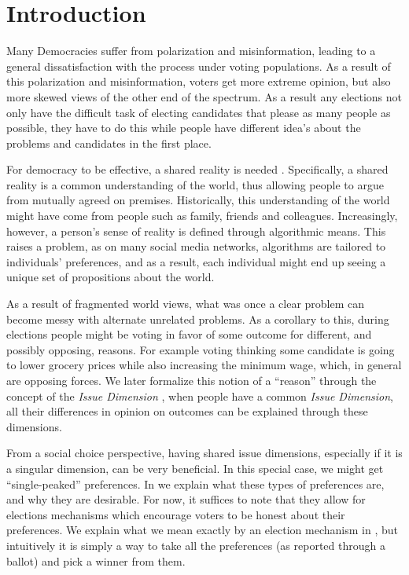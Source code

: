 \newpage
\chapter{Introduction}
\label{Introduction}

Many Democracies suffer from polarization and misinformation, leading to a
general dissatisfaction with the process under voting populations. As a result
of this polarization and misinformation, voters get more extreme opinion, but
also more skewed views of the other end of the spectrum. As a result any
elections not only have the difficult task of electing candidates that please
as many people as possible, they have to do this while people have different
idea's about the problems and candidates in the first place.

For democracy to be effective, a shared reality is needed \cite{}.
Specifically, a shared reality is a common understanding of the world, thus
allowing people to argue from mutually agreed on premises. Historically, this
understanding of the world might have come from people such as family, friends
and colleagues. Increasingly, however, a person's sense of reality is defined
through algorithmic means. This raises a problem, as on many social media
networks, algorithms are tailored to individuals' preferences, and as a result,
each individual might end up seeing a unique set of propositions about the
world.

As a result of fragmented world views, what was once a clear problem can become
messy with alternate unrelated problems. As a corollary to this, during
elections people might be voting in favor of some outcome for different, and
possibly opposing, reasons. For example voting thinking some candidate is going
to lower grocery prices while also increasing the minimum wage, which, in
general are opposing forces. We later formalize this notion of a ``reason''
through the concept of the \textit{Issue Dimension}
\cite{listTwoConceptsAgreement2002}, when people have a common \textit{Issue
	Dimension}, all their differences in opinion on outcomes can be explained
through these dimensions.

From a social choice perspective, having shared issue dimensions, especially if
it is a singular dimension, can be very beneficial. In this special case, we
might get ``single-peaked'' preferences. In  we explain what
these types of preferences are, and why they are desirable. For now, it
suffices to note that they allow for elections mechanisms which encourage
voters to be honest about their preferences. We explain what we mean exactly by
an election mechanism in , but intuitively it is
simply a way to take all the preferences (as reported through a ballot) and
pick a winner from them.

